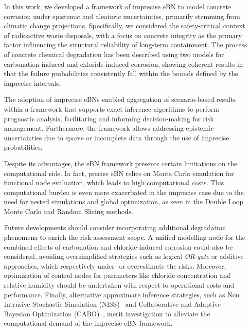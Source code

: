 In this work, we developed a framework of imprecise eBN to model concrete corrosion under epistemic and aleatoric uncertainties, primarily stemming from climatic change projections. 
Specifically, we considered the safety-critical context of radioactive waste disposals, with a focus on concrete integrity as the primary factor influencing the structural reliability of long-term containment. 
The process of concrete chemical degradation has been described using two models for carbonation-induced and chloride-induced corrosion, showing coherent results in that the failure probabilities consistently fall within the bounds defined by the imprecise intervals.

The adoption of imprecise eBNs enabled aggregation of scenario-based results within a framework that supports exact-inference algorithms to perform prognostic analysis, facilitating and informing decision-making for risk management. Furthermore, the framework allows addressing epistemic uncertainties due to sparse or incomplete data through the use of imprecise probabilities.

Despite its advantages, the eBN framework presents certain limitations on the computational side. In fact, precise eBN relies on Monte Carlo simulation for functional node evaluation, which leads to high computational costs. This computational burden is even more exacerbated in the imprecise case due to the need for nested simulations and global optimization, as seen in the Double Loop Monte Carlo and Random Slicing methods.

Future developments should consider incorporating additional degradation phenomena to enrich the risk assessment scope. A unified modelling node for the combined effects of carbonation and chloride-induced corrosion could also be considered, avoiding oversimplified strategies such as logical \textit{OR-gate} or additive approaches, which respectively under- or overestimate the risks. Moreover, optimization of control nodes for parameters like chloride concentration and relative humidity should be undertaken with respect to operational costs and performance. Finally, alternative approximate inference strategies, such as Non Intrusive Stochastic Simulation (NISS)~\cite{wei_non-intrusive_2019} and Collaborative and Adaptive Bayesian Optimization (CABO)~\cite{hong_sequential_2024}, merit investigation to alleviate the computational demand of the imprecise eBN framework.